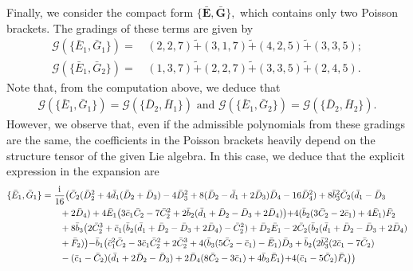 \documentclass[10pt]{amsart}
\theoremstyle{definition}
\theoremstyle{corollary}
\theoremstyle{remark}
\theoremstyle{conclusion}
\begin{document}
Finally, we consider the compact form $\{\bar{\textbf{E}},\bar{\textbf{G}}\},$ which contains only two Poisson brackets. The gradings of these terms are given by \begin{align*}
      \mathcal{G} (\{\bar{E}_1, \bar{G}_1\}) = & \,  (2,2,7) \tilde{+}  (3,1,7) \tilde{+} (4,2,5) \tilde{+} (3,3,5)   ; \\
     \mathcal{G} (\{\bar{E}_1, \bar{G}_2\}) = & \,  (1,3,7) \tilde{+}  (2,2,7) \tilde{+}  (3,3,5) \tilde{+} (2,4,5).
\end{align*} Note that, from the computation above, we deduce that \begin{align*}
     \mathcal{G} (\{\bar{E}_1, \bar{G}_1\}) = \mathcal{G} \left( \{\bar{D}_2,\bar{H}_1\}\right)\text{ and } \mathcal{G} (\{\bar{E}_1, \bar{G}_2\}) = \mathcal{G} \left( \{\bar{D}_2,\bar{H}_2\}\right).
\end{align*} 
However,   we observe that, even if the admissible polynomials from these gradings are the same, the coefficients in the Poisson brackets heavily depend on the structure tensor of the given Lie algebra. In this case, we deduce that the explicit expression in the expansion are  
\begin{align}
\{\bar{E}_1, \bar{G}_1\}&=\frac{{\rm i}}{16}\bigl(\bar{C}_2(\bar{D}_2^2+4\bar{d}_1(\bar{D}_2+\bar{D}_3)-4\bar{D}_3^2+8(\bar{D}_2-\bar{d}_1+2\bar{D}_3)\bar{D}_4-16 \bar{D}_4^2)+8 \bar{b}_3^2 \bar{C}_2(\bar{d}_1-\bar{D}_3\nonumber\\
& \hskip 0.7 cm+2\bar{D}_4)+4 \bar{E}_1\bigl(3 \bar{c}_1 \bar{C}_2-7 \bar{C}_2^2+2\bar{b}_2(\bar{d}_1+\bar{D}_2-\bar{D}_3+2\bar{D}_4)\bigl)+4(\bar{b}_2(3\bar{C}_2-2\bar{c}_1)+4\bar{E}_1)\bar{F}_2\nonumber\\
& \hskip 0.7 cm+8 \bar{b}_3\bigl( 2\bar{C}_2^3+\bar{c}_1(\bar{b}_2(\bar{d}_1+\bar{D}_2-\bar{D}_3+2\bar{D}_4)-\bar{C}_2^2)+\bar{D}_2 \bar{E}_1-2\bar{C}_2(\bar{b}_2(\bar{d}_1+\bar{D}_2-\bar{D}_3+2\bar{D}_4)\nonumber\\
& \hskip 0.7 cm+\bar{F}_2)\bigl)-\bar{b}_1 \bigl(\bar{c}_1^2 \bar{C}_2-3\bar{c}_1 \bar{C}_2^2+2\bar{C}_2^3+4(\bar{b}_3(5\bar{C}_2-\bar{c}_1)-\bar{E}_1)\bar{D}_3+\bar{b}_2 \bigl( 2 \bar{b}_3^2(2\bar{c}_1-7\bar{C}_2)\nonumber\\
& \hskip 0.7 cm-(\bar{c}_1-\bar{C}_2)(\bar{d}_1+2\bar{D}_2-\bar{D}_3)+2\bar{D}_4(8 \bar{C}_2-3 \bar{c}_1)+4 \bar{b}_3 \bar{E}_1\bigl)+4(\bar{c}_1-5\bar{C}_2)\bar{F}_4 \bigl) \bigl) \,
\end{align}
\end{document}
